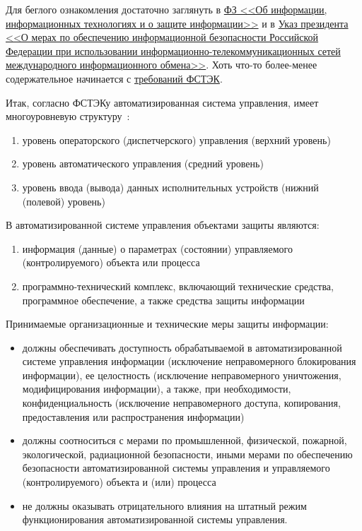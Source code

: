Для беглого ознакомления достаточно заглянуть в 
\href{http://www.consultant.ru/document/cons_doc_LAW_61798/0e9ec16b786dcbdaaa7f44abfc4a15e601d5be22/#dst100144}{ФЗ <<Об информации, информационных технологиях и о защите информации>>} и в \href{http://www.consultant.ru/document/cons_doc_LAW_75586/#dst0}{Указ президента <<О мерах по обеспечению информационной безопасности Российской Федерации при использовании информационно-телекоммуникационных сетей международного информационного обмена>>}. Хоть что-то более-менее содержательное начинается с \href{https://fstec.ru/en/288-tekhnicheskaya-zashchita-informatsii/obespechenie-bezopasnosti-kriticheskoj-informatsionnoj-infrastruktury/prikazy/1702-prikaz-fstek-rossii-ot-14-marta-2014-g-n-32}{требований ФСТЭК}. 

Итак, согласно ФСТЭКу автоматизированная система управления, имеет многоуровневую структуру~\label{pon:bez}:
\begin{enumerate}
	\item уровень операторского (диспетчерского) управления (верхний уровень)
	\item уровень автоматического управления (средний уровень)
	\item уровень ввода (вывода) данных исполнительных устройств (нижний (полевой) уровень)
\end{enumerate}

В автоматизированной системе управления объектами защиты являются:
\begin{enumerate}
	\item информация (данные) о параметрах (состоянии) управляемого (контролируемого) объекта или процесса
	\item программно-технический комплекс, включающий технические средства, программное обеспечение, а также средства защиты информации
\end{enumerate}
\begin{grayquote}
	Принимаемые организационные и технические меры защиты информации:
	\begin{itemize}
		\item должны обеспечивать доступность обрабатываемой в автоматизированной системе управления информации (исключение неправомерного блокирования информации), ее целостность (исключение неправомерного уничтожения, модифицирования информации), а также, при необходимости, конфиденциальность (исключение неправомерного доступа, копирования, предоставления или распространения информации)
		
		\item должны соотноситься с мерами по промышленной, физической, пожарной, экологической, радиационной безопасности, иными мерами по обеспечению безопасности автоматизированной системы управления и управляемого (контролируемого) объекта и (или) процесса
		
		\item не должны оказывать отрицательного влияния на штатный режим функционирования автоматизированной системы управления.
	\end{itemize}
\end{grayquote}

